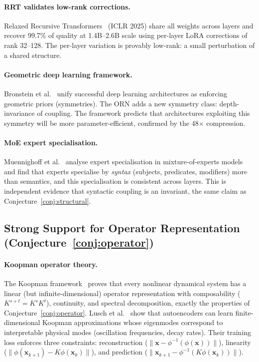 \documentclass[11pt, a4paper]{article}
\newcommand{\x}{\mathbf{x}}
\theoremstyle{plain}
\theoremstyle{definition}
\theoremstyle{remark}
\begin{document}
\paragraph{RRT validates low-rank corrections.}
Relaxed Recursive Transformers~\cite{relaxedrecursive2025} (ICLR 2025) share all weights across layers and recover 99.7\% of quality at 1.4B--2.6B scale using per-layer LoRA corrections of rank 32--128.
The per-layer variation is provably low-rank: a small perturbation of a shared structure.

\paragraph{Geometric deep learning framework.}
Bronstein et al.~\cite{bronstein2021gdl} unify successful deep learning architectures as enforcing geometric priors (symmetries).
The ORN adds a new symmetry class: depth-invariance of coupling.
The framework predicts that architectures exploiting this symmetry will be more parameter-efficient, confirmed by the 48$\times$ compression.

\paragraph{MoE expert specialisation.}
Muennighoff et al.~\cite{muennighoff2024olmoe} analyse expert specialisation in mixture-of-experts models and find that experts specialise by \emph{syntax} (subjects, predicates, modifiers) more than semantics, and this specialisation is consistent across layers.
This is independent evidence that syntactic coupling is an invariant, the same claim as Conjecture~\ref{conj:structural}.

\subsection{Strong Support for Operator Representation (Conjecture~\ref{conj:operator})}

\paragraph{Koopman operator theory.}
The Koopman framework~\cite{brunton2022koopman} proves that every nonlinear dynamical system has a linear (but infinite-dimensional) operator representation with composability ($K^{s+t} = K^s K^t$), continuity, and spectral decomposition, exactly the properties of Conjecture~\ref{conj:operator}.
Lusch et al.~\cite{lusch2018koopman} show that autoencoders can learn finite-dimensional Koopman approximations whose eigenmodes correspond to interpretable physical modes (oscillation frequencies, decay rates).
Their training loss enforces three constraints: reconstruction ($\|\x - \phi^{-1}(\phi(\x))\|$), linearity ($\|\phi(\x_{k+1}) - K\phi(\x_k)\|$), and prediction ($\|\x_{k+1} - \phi^{-1}(K\phi(\x_k))\|$).
\end{document}

